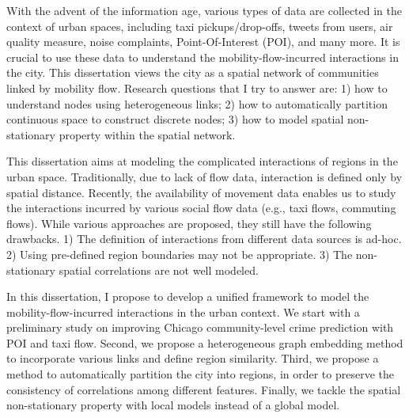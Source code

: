 With the advent of the information age, various types of data are collected in the context of urban spaces, including taxi pickups/drop-offs, tweets from users, air quality measure, noise complaints, Point-Of-Interest (POI), and many more. It is crucial to use these data to understand the mobility-flow-incurred interactions in the city. This dissertation views the city as a spatial network of communities linked by mobility flow. Research questions that I try to answer are: 1) how to understand nodes using heterogeneous links; 2) how to automatically partition continuous space to construct discrete nodes; 3) how to model spatial non-stationary property within the spatial network.

This dissertation aims at modeling the complicated interactions of regions in the urban space. Traditionally, due to lack of flow data, interaction is defined only by spatial distance. Recently, the availability of movement data enables us to study the interactions incurred by various social flow data (e.g., taxi flows, commuting flows).  While various approaches are proposed, they still have the following drawbacks. 1) The definition of interactions from different data sources is ad-hoc. 2) Using pre-defined region boundaries may not be appropriate. 3) The non-stationary spatial correlations are not well modeled.
 
In this dissertation, I propose to develop a unified framework to model the mobility-flow-incurred interactions in the urban context. We start with a preliminary study on improving Chicago community-level crime prediction with POI and taxi flow. Second, we propose a heterogeneous graph embedding method to incorporate various links and define region similarity. Third, we propose a method to automatically partition the city into regions, in order to preserve the consistency of correlations among different features. Finally, we tackle the spatial non-stationary property with local models instead of a global model. 





